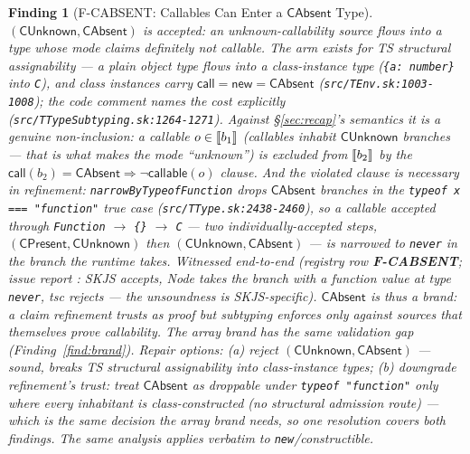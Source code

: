 \documentclass[11pt]{article}
\newtheorem{finding}[theorem]{Finding}
\begin{document}
\begin{finding}[F-CABSENT: Callables Can Enter a $\mathsf{CAbsent}$ Type]
\label{find:cabsent}
$(\mathsf{CUnknown}, \mathsf{CAbsent})$ is accepted: an
unknown-callability source flows into a type whose mode claims
\emph{definitely not callable}. The arm exists for TS structural
assignability --- a plain object type flows into a class-instance type
(\texttt{\{a: number\}} into \texttt{C}), and class instances carry
$\mathsf{call} = \mathsf{new} = \mathsf{CAbsent}$
(\texttt{src/TEnv.sk:1003-1008}); the code comment names the cost
explicitly (\texttt{src/TTypeSubtyping.sk:1264-1271}). Against
\S\ref{sec:recap}'s semantics it is a genuine non-inclusion: a callable
$o \in \llbracket b_1 \rrbracket$ (callables inhabit $\mathsf{CUnknown}$ branches ---
that is what makes the mode ``unknown'') is excluded from $\llbracket b_2 \rrbracket$
by the $\mathsf{call}(b_2) = \mathsf{CAbsent} \Rightarrow
\neg\mathsf{callable}(o)$ clause. And the violated clause is
necessary in refinement: \texttt{narrowByTypeofFunction} drops
$\mathsf{CAbsent}$ branches in the \texttt{typeof x === "function"}
true case (\texttt{src/TType.sk:2438-2460}), so a callable accepted through
\texttt{Function} $\to$ \texttt{\{\}} $\to$ \texttt{C} --- two
individually-accepted steps, $(\mathsf{CPresent}, \mathsf{CUnknown})$
then $(\mathsf{CUnknown}, \mathsf{CAbsent})$ --- is narrowed to
\texttt{never} in the branch the runtime takes. Witnessed end-to-end
(registry row \textbf{F-CABSENT}; issue report
: SKJS accepts, Node takes the
branch with a function value at type \texttt{never}, tsc rejects ---
the unsoundness is SKJS-specific). $\mathsf{CAbsent}$ is thus a
\emph{brand}: a claim refinement trusts as proof but subtyping enforces
only against sources that themselves prove callability. The array brand
has the same validation gap (Finding~\ref{find:brand}). Repair options:
(a) reject
$(\mathsf{CUnknown}, \mathsf{CAbsent})$ --- sound, breaks TS structural
assignability into class-instance types; (b) downgrade refinement's
trust: treat $\mathsf{CAbsent}$ as droppable under
\texttt{typeof "function"} only where every inhabitant is
class-constructed (no structural admission route) --- which is the same
decision the array brand needs, so one resolution covers
both findings. The same analysis applies verbatim to
\texttt{new}/\textsf{constructible}.
\end{finding}
\end{document}
